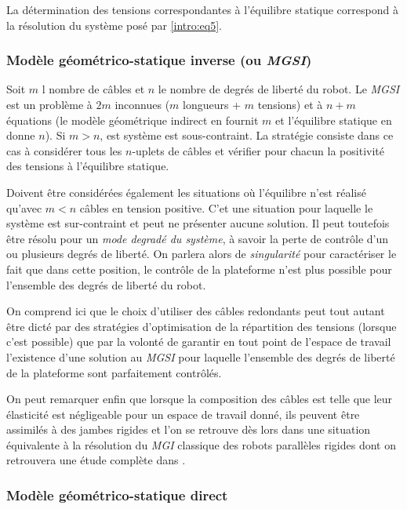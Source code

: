 La détermination des tensions correspondantes à l'équilibre statique correspond à la résolution du système posé par \ref{intro:eq5}.

\subsubsection{Modèle géométrico-statique inverse (ou {\it MGSI})}

Soit $m$ l nombre de câbles et $n$ le nombre de degrés de liberté du robot. Le {\it MGSI} est un problème à $2m$ inconnues ($m$ longueurs + $m$ tensions) et à $n+m$ équations (le modèle géométrique indirect en fournit $m$ et l'équilibre statique en donne $n$). Si $m > n$, est système est sous-contraint. La stratégie consiste dans ce cas à considérer tous les $n$-uplets de câbles et vérifier pour chacun la positivité des tensions à l'équilibre statique.

Doivent être considérées également les situations où l'équilibre n'est réalisé qu'avec $m < n$ câbles en tension positive. C'et une situation pour laquelle le système est sur-contraint et peut ne présenter aucune solution. Il peut toutefois être résolu pour un {\it mode degradé du système}, à savoir la perte de contrôle d'un ou plusieurs degrés de liberté. On parlera alors de {\it singularité} pour caractériser le fait que dans cette position, le contrôle de la plateforme n'est plus possible pour l'ensemble des degrés de liberté du robot.

On comprend ici que le choix d'utiliser des câbles redondants peut tout autant être dicté par des stratégies d'optimisation de la répartition des tensions (lorsque c'est possible) que par la volonté de garantir en tout point de l'espace de travail l'existence d'une solution au {\it MGSI} pour laquelle l'ensemble des degrés de liberté de la plateforme sont parfaitement contrôlés.

On peut remarquer enfin que lorsque la composition des câbles est telle que leur élasticité est négligeable pour un espace de travail donné, ils peuvent être assimilés à des jambes rigides et l'on se retrouve dès lors dans une situation équivalente à la résolution du {\it MGI} classique des robots parallèles rigides dont on retrouvera une étude complète dans \cite{merlet1997robots}.

\subsubsection{Modèle géométrico-statique direct}


